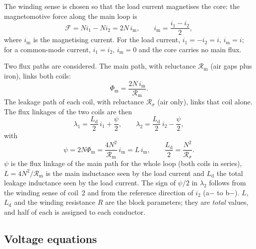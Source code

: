 \documentclass[11pt,a4paper]{article}
\begin{document}
The winding sense is chosen so that the load current magnetises the core: the
magnetomotive force along the main loop is
\begin{equation}
  \mathcal{F} = N i_1 - N i_2 = 2N\, i_\mathrm{m}, \qquad
  i_\mathrm{m} = \frac{i_1 - i_2}{2},
  \label{eq:im}
\end{equation}
where $i_\mathrm{m}$ is the magnetising current. For the load current, $i_1 = -i_2 = i$,
$i_\mathrm{m} = i$; for a common-mode current, $i_1 = i_2$, $i_\mathrm{m} = 0$ and the
core carries no main flux.

Two flux paths are considered. The main path, with reluctance $\mathcal{R}_\mathrm{m}$
(air gaps plus iron), links both coils:
\begin{equation}
  \Phi_\mathrm{m} = \frac{2N\, i_\mathrm{m}}{\mathcal{R}_\mathrm{m}} .
\end{equation}
The leakage path of each coil, with reluctance $\mathcal{R}_\sigma$ (air only), links
that coil alone. The flux linkages of the two coils are then
\begin{equation}
  \lambda_1 = \frac{L_\mathrm{d}}{2}\, i_1 + \frac{\psi}{2}, \qquad
  \lambda_2 = \frac{L_\mathrm{d}}{2}\, i_2 - \frac{\psi}{2},
  \label{eq:lambda}
\end{equation}
with
\begin{equation}
  \psi = 2N\Phi_\mathrm{m} = \frac{4N^2}{\mathcal{R}_\mathrm{m}}\, i_\mathrm{m} = L\, i_\mathrm{m},
  \qquad
  \frac{L_\mathrm{d}}{2} = \frac{N^2}{\mathcal{R}_\sigma} .
  \label{eq:LLd}
\end{equation}
$\psi$ is the flux linkage of the main path for the whole loop (both coils in series),
$L = 4N^2/\mathcal{R}_\mathrm{m}$ is the main inductance seen by the load current and
$L_\mathrm{d}$ the total leakage inductance seen by the load current. The sign of
$\psi/2$ in $\lambda_2$ follows from the winding sense of coil~2 and from the reference
direction of $i_2$ (a$-$ to b$-$). $L$, $L_\mathrm{d}$ and the winding resistance $R$
are the block parameters; they are \emph{total} values, and half of each is assigned to
each conductor.

\subsection{Voltage equations}
\end{document}
